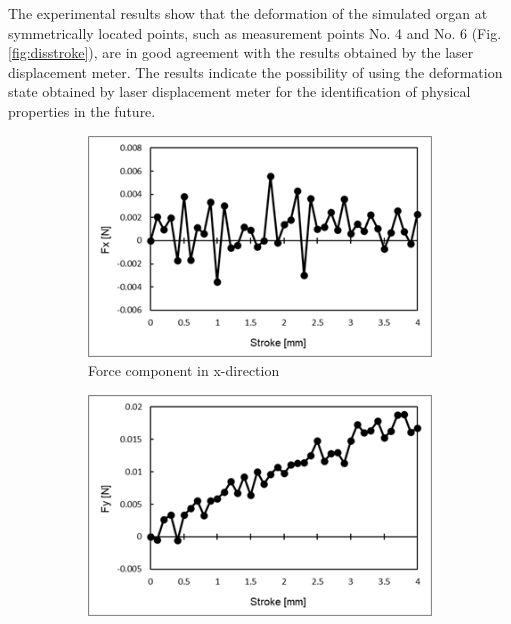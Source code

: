 The experimental results show that the deformation of the simulated organ at symmetrically located points, such as measurement points No. \SI{4}{} and No. \SI{6}{} (Fig. \ref{fig:disstroke}), are in good agreement with the results obtained by the laser displacement meter. The results indicate the possibility of using the deformation state obtained by laser displacement meter for the identification of physical properties in the future.
\begin{figure}
    \centering
    \begin{subfigure}[b]{0.45\textwidth}
    \centering
    \includegraphics[width=\textwidth]{Images/appendix/ynu/fig6forcestroke_a.png}
    \caption{Force component in x-direction}
    \label{fig:forcezxnu}
    \end{subfigure}
    \hfill
    \begin{subfigure}[b]{0.45\textwidth}
    \centering
    \includegraphics[width=\textwidth]{Images/appendix/ynu/fig6forcestroke_b.png}

\end{subfigure}
\end{figure}
